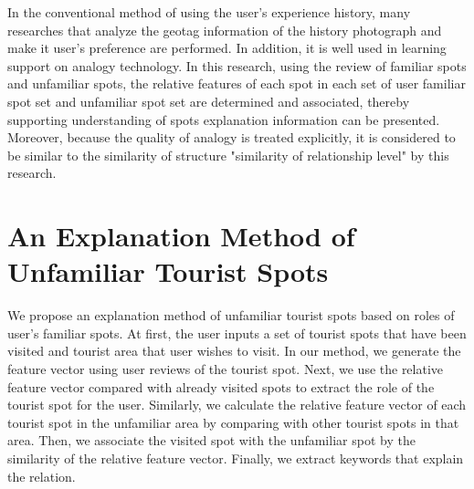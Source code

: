 \documentclass[journal]{IAENGtran}
\begin{document}
In the conventional method of using the user's experience history, many researches that analyze the geotag information of the history photograph and make it user's preference are performed.
In addition, it is well used in learning support on analogy technology.
In this research, using the review of familiar spots and unfamiliar spots, the relative features of each spot in each set of user familiar spot set and unfamiliar spot set are determined and associated, thereby supporting understanding of spots explanation information can be presented.
Moreover, because the quality of analogy is treated explicitly, it is considered to be similar to the similarity of structure "similarity of relationship level" by this research.


\section{An Explanation Method of Unfamiliar Tourist Spots}
\label{sec:An Explainaton Method of Unfamiliar Tourist Spots}
We propose an explanation method of unfamiliar tourist spots based on roles of user's familiar spots.
At first, the user inputs a set of tourist spots that have been visited and tourist area that user wishes to visit.
In our method, we generate the feature vector using user reviews of the tourist spot.
Next, we use the relative feature vector compared with already visited spots to extract the role of the tourist spot for the user.
Similarly, we calculate the relative feature vector of each tourist spot in the unfamiliar area by comparing with other tourist spots in that area.
Then, we associate the visited spot with the unfamiliar spot by the similarity of the relative feature vector.
Finally, we extract keywords that explain the relation.
\end{document}
